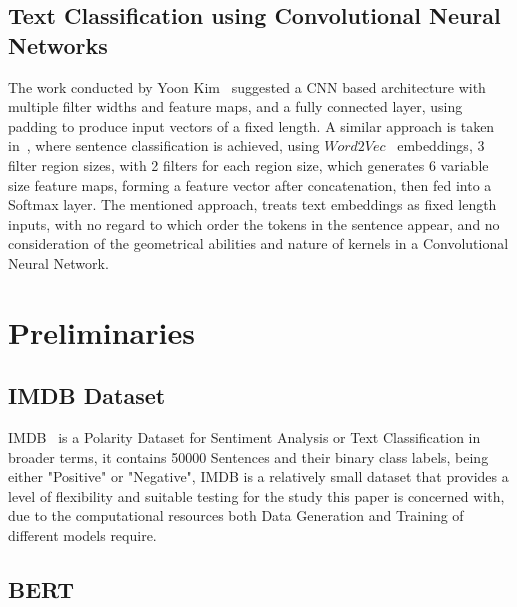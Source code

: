 \documentclass[conference]{IEEEtran}
\begin{document}
\subsection{Text Classification using Convolutional Neural Networks}
The work conducted by Yoon Kim~\cite{kim2014convolutional} suggested a CNN based architecture with multiple filter widths and feature maps, and a fully connected layer,  using padding to produce input vectors of a fixed length. A similar approach is taken in~\cite{conv4text}, where sentence classification is achieved, using $Word2Vec$~\cite{word2vec} embeddings, 3 filter region sizes, with 2 filters for each region size, which generates 6 variable size feature maps, forming a feature vector after concatenation, then fed into a Softmax layer. The mentioned approach, treats text embeddings as fixed length inputs, with no regard to which order the tokens in the sentence appear, and no consideration of the geometrical abilities and nature of kernels in a Convolutional Neural Network.

\section{Preliminaries}
\subsection{IMDB Dataset}
IMDB~\cite{imdb} is a Polarity Dataset for Sentiment Analysis or Text Classification in broader terms, it contains 50000 Sentences and their binary class labels, being either "Positive" or "Negative", IMDB is a relatively small dataset that provides a level of flexibility and suitable testing for the study this paper is concerned with, due to the computational resources both Data Generation and Training of different models require. 
		
\subsection{BERT}
			
\end{document}
